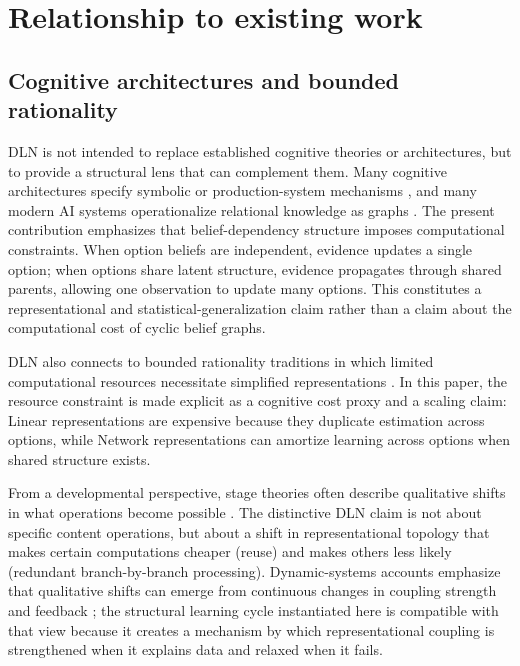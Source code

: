 \documentclass[11pt]{article}
\begin{document}
\section{Relationship to existing work}

\subsection{Cognitive architectures and bounded rationality}

DLN is not intended to replace established cognitive theories or architectures, but to provide a structural lens that can complement them. Many cognitive architectures specify symbolic or production-system mechanisms \cite{ACTR2004,Laird2012}, and many modern AI systems operationalize relational knowledge as graphs \cite{Hogan2021}. The present contribution emphasizes that belief-dependency structure imposes computational constraints. When option beliefs are independent, evidence updates a single option; when options share latent structure, evidence propagates through shared parents, allowing one observation to update many options. This constitutes a representational and statistical-generalization claim rather than a claim about the computational cost of cyclic belief graphs.

DLN also connects to bounded rationality traditions in which limited computational resources necessitate simplified representations \cite{Simon1955,TverskyKahneman1974,GigerenzerGoldstein1996}. In this paper, the resource constraint is made explicit as a cognitive cost proxy and a scaling claim: Linear representations are expensive because they duplicate estimation across options, while Network representations can amortize learning across options when shared structure exists.

From a developmental perspective, stage theories often describe qualitative shifts in what operations become possible \cite{Piaget1952,Kegan1994}. The distinctive DLN claim is not about specific content operations, but about a shift in representational topology that makes certain computations cheaper (reuse) and makes others less likely (redundant branch-by-branch processing). Dynamic-systems accounts emphasize that qualitative shifts can emerge from continuous changes in coupling strength and feedback \cite{ThelenSmith1994}; the structural learning cycle instantiated here is compatible with that view because it creates a mechanism by which representational coupling is strengthened when it explains data and relaxed when it fails.
\end{document}
